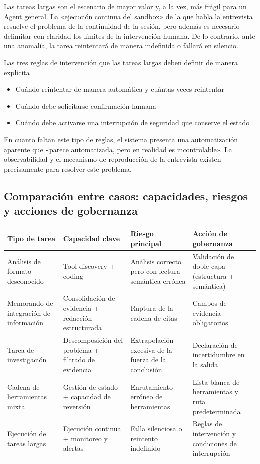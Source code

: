 Las tareas largas son el escenario de mayor valor y, a la vez, más frágil para un Agent general. La «ejecución continua del sandbox» de la que habla la entrevista resuelve el problema de la continuidad de la sesión, pero además es necesario delimitar con claridad los límites de la intervención humana. De lo contrario, ante una anomalía, la tarea reintentará de manera indefinida o fallará en silencio.

\begin{warningbox}{Las tres reglas de intervención que las tareas largas deben definir de manera explícita}
\begin{itemize}
    \item Cuándo reintentar de manera automática y cuántas veces reintentar
    \item Cuándo debe solicitarse confirmación humana
    \item Cuándo debe activarse una interrupción de seguridad que conserve el estado
\end{itemize}
\end{warningbox}

En cuanto faltan este tipo de reglas, el sistema presenta una automatización aparente que «parece automatizada, pero en realidad es incontrolable». La observabilidad y el mecanismo de reproducción de la entrevista existen precisamente para resolver este problema.

\subsection{Comparación entre casos: capacidades, riesgos y acciones de gobernanza}

\begin{center}
\begin{tabular}{p{3.0cm}p{3.5cm}p{4.1cm}p{3.5cm}}
\toprule
Tipo de tarea & Capacidad clave & Riesgo principal & Acción de gobernanza \\
\midrule
Análisis de formato desconocido & Tool discovery + coding & Análisis correcto pero con lectura semántica errónea & Validación de doble capa (estructura + semántica) \\
Memorando de integración de información & Consolidación de evidencia + redacción estructurada & Ruptura de la cadena de citas & Campos de evidencia obligatorios \\
Tarea de investigación & Descomposición del problema + filtrado de evidencia & Extrapolación excesiva de la fuerza de la conclusión & Declaración de incertidumbre en la salida \\
Cadena de herramientas mixta & Gestión de estado + capacidad de reversión & Enrutamiento erróneo de herramientas & Lista blanca de herramientas y ruta predeterminada \\
Ejecución de tareas largas & Ejecución continua + monitoreo y alertas & Falla silenciosa o reintento indefinido & Reglas de intervención y condiciones de interrupción \\
\bottomrule
\end{tabular}
\end{center}


